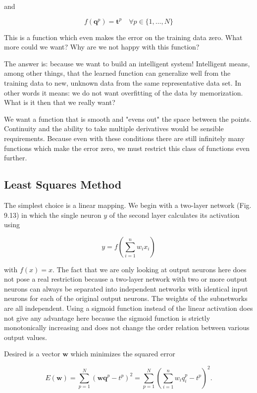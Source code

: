 \documentclass[10pt]{book}
\begin{document}
and

$$
f\left(\boldsymbol{q}^{p}\right)=\boldsymbol{t}^{p} \quad \forall p \in\{1, \ldots, N\}
$$

This is a function which even makes the error on the training data zero. What more could we want? Why are we not happy with this function?

The answer is: because we want to build an intelligent system! Intelligent means, among other things, that the learned function can generalize well from the training data to new, unknown data from the same representative data set. In other words it means: we do not want overfitting of the data by memorization. What is it then that we really want?

We want a function that is smooth and "evens out" the space between the points. Continuity and the ability to take multiple derivatives would be sensible requirements. Because even with these conditions there are still infinitely many functions which make the error zero, we must restrict this class of functions even further.

\subsection{Least Squares Method}
The simplest choice is a linear mapping. We begin with a two-layer network (Fig. 9.13) in which the single neuron $y$ of the second layer calculates its activation using


$$
y=f\left(\sum_{i=1}^{n} w_{i} x_{i}\right)
$$

with $f(x)=x$. The fact that we are only looking at output neurons here does not pose a real restriction because a two-layer network with two or more output neurons can always be separated into independent networks with identical input neurons for each of the original output neurons. The weights of the subnetworks are all independent. Using a sigmoid function instead of the linear activation does not give any advantage here because the sigmoid function is strictly monotonically increasing and does not change the order relation between various output values.

Desired is a vector $\boldsymbol{w}$ which minimizes the squared error

$$
E(\boldsymbol{w})=\sum_{p=1}^{N}\left(\boldsymbol{w} \boldsymbol{q}^{p}-t^{p}\right)^{2}=\sum_{p=1}^{N}\left(\sum_{i=1}^{n} w_{i} q_{i}^{p}-t^{p}\right)^{2} .
$$
\end{document}
